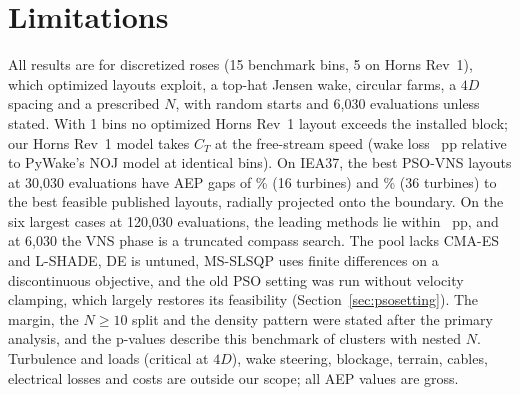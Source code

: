 \section{Limitations}
\label{sec:limits}
All results are for discretized roses (15\textdegree{} benchmark bins, 5\textdegree{} on Horns Rev~1), which optimized layouts exploit, a top-hat Jensen wake, circular farms, a $4D$ spacing and a prescribed $N$, with random starts and 6,030 evaluations unless stated. With 1\textdegree{} bins no optimized Horns Rev~1 layout exceeds the installed block; our Horns Rev~1 model takes $C_T$ at the free-stream speed (wake loss \NFPyWakeLossDiffPP~pp relative to PyWake's NOJ model at identical bins). On IEA37, the best PSO-VNS layouts at 30,030 evaluations have AEP gaps of \NFIEAGapSixteenThirtyKProj\% (16 turbines) and \NFIEAGapThirtySixThirtyKProj\% (36 turbines) to the best feasible published layouts, radially projected onto the boundary. On the six largest cases at 120,030 evaluations, the leading methods lie within \NBudCloseGapOneTwentyK~pp, and at 6,030 the VNS phase is a truncated compass search. The pool lacks CMA-ES~\cite{HansenOstermeier2001} and L-SHADE, DE is untuned, MS-SLSQP uses finite differences on a discontinuous objective, and the old PSO setting was run without velocity clamping, which largely restores its feasibility (Section~\ref{sec:psosetting}). The margin, the $N\ge10$ split and the density pattern were stated after the primary analysis, and the p-values describe this benchmark of \NXClusters{} clusters with nested $N$. Turbulence and loads (critical at $4D$), wake steering, blockage, terrain, cables, electrical losses and costs are outside our scope; all AEP values are gross.

